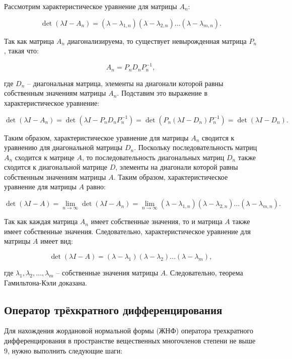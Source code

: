 Рассмотрим характеристическое уравнение для матрицы $A_n$:

\[ \det(\lambda I - A_n) = (\lambda - \lambda_{1,n})(\lambda - \lambda_{2,n}) \dots (\lambda - \lambda_{m,n}). \]

Так как матрица $A_n$ диагонализируема, то существует невырожденная матрица $P_n$, такая что:

\[ A_n = P_n D_n P_n^{-1}, \]

где $D_n$ -- диагональная матрица, элементы на диагонали которой равны собственным значениям матрицы $A_n$.
Подставим это выражение в характеристическое уравнение:

\[ \det(\lambda I - A_n) = \det(\lambda I - P_n D_n P_n^{-1}) = \det(P_n(\lambda I - D_n)P_n^{-1}) =
\det(\lambda I - D_n). \]

Таким образом, характеристическое уравнение для матрицы $A_n$ сводится к уравнению для диагональной матрицы $D_n$.
Поскольку последовательность матриц $A_n$ сходится к матрице $A$, то последовательность диагональных матриц $D_n$
также сходится к диагональной матрице $D$, элементы на диагонали которой равны собственным значениям матрицы $A$.
Таким образом, характеристическое уравнение для матрицы $A$ равно:

\[ \det(\lambda I - A) = \lim_{n \rightarrow \infty} \det(\lambda I - A_n) = \lim_{n \rightarrow \infty} (\lambda -
\lambda_{1,n})(\lambda - \lambda_{2,n}) \dots (\lambda - \lambda_{m,n}). \]

Так как каждая матрица $A_n$ имеет собственные значения, то и матрица $A$ также имеет собственные значения.
Следовательно, характеристическое уравнение для матрицы $A$ имеет вид:

\[ \det(\lambda I - A) = (\lambda - \lambda_1)(\lambda - \lambda_2) \dots (\lambda - \lambda_m), \]

где $\lambda_1, \lambda_2, \dots, \lambda_m$ -- собственные значения матрицы $A$.
Следовательно, теорема Гамильтона-Кэли доказана.


\subsection*{Оператор трёхкратного дифференцирования} 

Для нахождения жордановой нормальной формы (ЖНФ) оператора трехкратного дифференцирования в пространстве
вещественных многочленов степени не выше 9, нужно выполнить следующие шаги:

